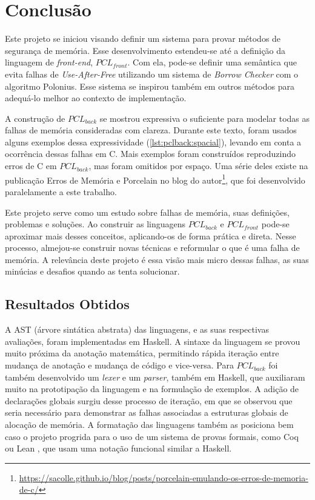 \chapter{Conclusão}
\label{chap7}

Este projeto se iniciou visando definir um sistema para provar métodos de segurança de memória. Esse desenvolvimento estendeu-se até a definição da linguagem de \emph{front-end}, $PCL_{front}$. Com ela, pode-se definir uma semântica que evita falhas de \emph{Use-After-Free} utilizando um sistema de \emph{Borrow Checker} com o algoritmo Polonius. Esse sistema se inspirou também em outros métodos para adequá-lo melhor ao contexto de implementação.

A construção de $PCL_{back}$ se mostrou expressiva o suficiente para modelar todas as falhas de memória consideradas com clareza. Durante este texto, foram usados alguns exemplos dessa expressividade (\ref{lst:pclback:spacial}), levando em conta a ocorrência dessas falhas em C. Mais exemplos foram construídos reproduzindo erros de C em $PCL_{back}$, mas foram omitidos por espaço. Uma série deles existe na publicação Erros de Memória e Porcelain no blog do autor\footnote{\url{https://sacolle.github.io/blog/posts/porcelain-emulando-os-erros-de-memoria-de-c/}}, que foi desenvolvido paralelamente a este trabalho.

Este projeto serve como um estudo sobre falhas de memória, suas definições, problemas e soluções. Ao construir as linguagens $PCL_{back}$ e $PCL_{front}$ pode-se aproximar mais desses conceitos, aplicando-os de forma prática e direta. Nesse processo, almejou-se construir novas técnicas e reformular o que é uma falha de memória. A relevância deste projeto é essa visão mais micro dessas falhas, as suas minúcias e desafios quando as tenta solucionar.

\section{Resultados Obtidos}

A AST (árvore sintática abstrata) das linguagens, e as suas respectivas avaliações, foram implementadas em Haskell. A sintaxe da linguagem se provou muito próxima da anotação matemática, permitindo rápida iteração entre mudança de anotação e mudança de código e vice-versa. Para $PCL_{back}$ foi também desenvolvido um \emph{lexer} e um \emph{parser}, também em Haskell, que auxiliaram muito na prototipação da linguagem e na formulação de exemplos. A adição de declarações globais surgiu desse processo de iteração, em que se observou que seria necessário para demonstrar as falhas associadas a estruturas globais de alocação de memória. A formatação das linguagens também as posiciona bem caso o projeto progrida para o uso de um sistema de provas formais, como Coq \cite{COQ} ou Lean \cite{LEAN4}, que usam uma notação funcional similar a Haskell.
